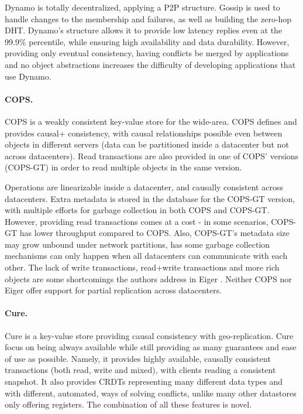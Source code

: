 Dynamo is totally decentralized, applying a P2P structure.
Gossip is used to handle changes to the membership and failures, as well as building the zero-hop DHT.
Dynamo's structure allows it to provide low latency replies even at the 99.9\% percentile, while ensuring high availability and data durability.
However, providing only eventual consistency, having conflicts be merged by applications and no object abstractions increases the difficulty of developing applications that use Dynamo.

\paragraph{COPS.} COPS \cite{cops} is a weakly consistent key-value store for the wide-area.
COPS defines and provides causal+ consistency, with causal relationships possible even between objects in different servers (data can be partitioned inside a datacenter but not across datacenters).
Read transactions are also provided in one of COPS' versions (COPS-GT) in order to read multiple objects in the same version.

Operations are linearizable inside a datacenter, and causally consistent across datacenters.
Extra metadata is stored in the database for the COPS-GT version, with multiple efforts for garbage collection in both COPS and COPS-GT.
However, providing read transactions comes at a cost - in some scenarios, COPS-GT has lower throughput compared to COPS.
Also, COPS-GT's metadata size may grow unbound under network partitions, has some garbage collection mechanisms can only happen when all datacenters can communicate with each other.
The lack of write transactions, read+write transactions and more rich objects are some shortcomings the authors address in Eiger \cite{eiger}.
Neither COPS nor Eiger offer support for partial replication across datacenters.

\paragraph{Cure.} Cure \cite{cure} is a key-value store providing causal consistency with geo-replication.
Cure focus on being always available while still providing as many guarantees and ease of use as possible.
Namely, it provides highly available, causally consistent transactions (both read, write and mixed), with clients reading a consistent snapshot.
It also provides CRDTs representing many different data types and with different, automated, ways of solving conflicts, unlike many other datastores only offering registers.
The combination of all these features is novel.

